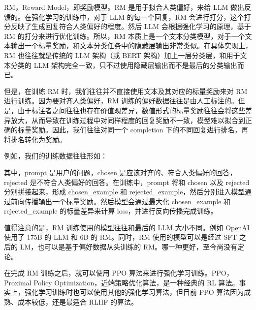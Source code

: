 \documentclass[12pt,a4paper]{book}
\begin{document}
RM，Reward Model，即奖励模型。RM 是用于拟合人类偏好，来给 LLM
做出反馈的。在强化学习的训练中，对于 LLM 的每一个回复，RM
会进行打分，这个打分反映了生成回复符合人类偏好的程度。然后 LLM
会根据强化学习的原理，基于 RM 的打分来进行优化训练。所以，RM
本质上是一个文本分类模型，对于一个文本输出一个标量奖励，和文本分类任务中的隐藏层输出非常类似。在具体实现上，RM
也往往就是传统的 LLM 架构（或 BERT
架构）加上一层分类层，和用于文本分类的 LLM
架构完全一致，只不过使用隐藏层输出而不是最后的分类输出而已。

但是，在训练 RM 时，我们往往并不直接使用文本及其对应的标量奖励来对 RM
进行训练。因为要对齐人类偏好，RM
训练的偏好数据往往是由人工标注的。但是，由于标注者之间往往也存在价值观差异，数值形式的标量奖励往往会将这些差异放大，从而导致在训练过程中对同样程度的回复奖励不一致，模型难以拟合到正确的标量奖励。因此，我们往往对同一个
completion 下的不同回复进行排名，再将排名转化为奖励。

例如，我们的训练数据往往形如：

\begin{Shaded}
\begin{Highlighting}[]
\FunctionTok{\{}
    \FunctionTok{:}\FunctionTok{,}
    \FunctionTok{:}\FunctionTok{,}
    \FunctionTok{:}
\FunctionTok{\}}
\end{Highlighting}
\end{Shaded}

其中，prompt 是用户的问题，chosen
是应该对齐的、符合人类偏好的回答，rejected
是不符合人类偏好的回答。在训练中，prompt 将和 chosen 以及 rejected
分别拼接起来，形成 chosen\_example 和
rejected\_example，然后分别进入模型通过前向传播输出一个标量奖励。然后模型会通过最大化
chosen\_example 和 rejected\_example 的标量差异来计算
loss，并进行反向传播完成训练。

值得注意的是，RM 训练使用的模型往往和最后的 LLM 大小不同。例如 OpenAI
使用了 175B 的 LLM 和 6B 的 RM。同时，RM 使用的模型可以是经过 SFT 之后的
LM，也可以是基于偏好数据从头训练的 RM。哪一种更好，至今尚没有定论。

在完成 RM 训练之后，就可以使用 PPO 算法来进行强化学习训练。PPO，Proximal
Policy Optimization，近端策略优化算法，是一种经典的 RL
算法。事实上，强化学习训练时也可以使用其他的强化学习算法，但目前 PPO
算法因为成熟、成本较低，还是最适合 RLHF 的算法。
\end{document}

